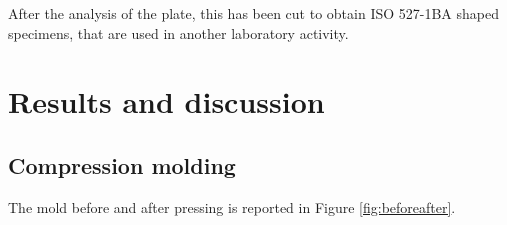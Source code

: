 \documentclass[a4paper, 11pt]{article}
\begin{document}
After the analysis of the plate, this has been cut to obtain ISO 527-1BA shaped specimens, that are used in another laboratory activity.     

\section{Results and discussion}

\subsection{Compression molding}

The mold before and after pressing is reported in Figure \ref{fig:beforeafter}. 

\begin{figure}[htp]
	\centering
	 \qquad 
	\subfloat[][]

\end{figure}
\end{document}
